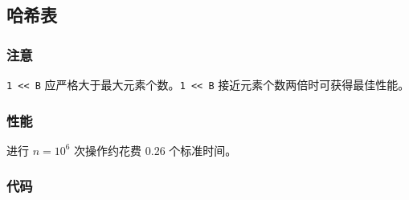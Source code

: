 \subsection{哈希表}

\subsubsection{注意}

\lstinline{1 << B} 应严格大于最大元素个数。\lstinline{1 << B} 接近元素个数两倍时可获得最佳性能。

\subsubsection{性能}

进行 $n = 10^6$ 次操作约花费 0.26 个标准时间。

\subsubsection{代码}



